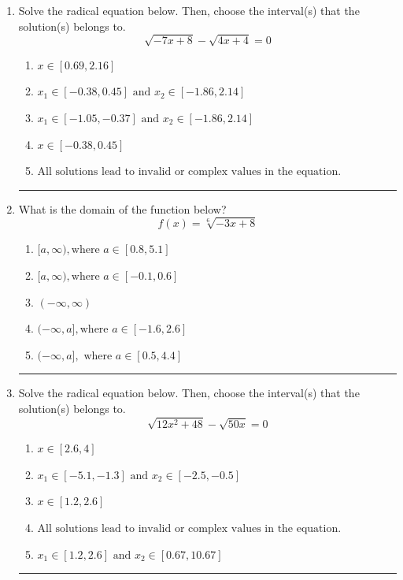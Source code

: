 \documentclass[14pt]{extbook}
\newcommand{\litem}[1]{\item#1\hspace*{-1cm}\rule{\textwidth}{0.4pt}}
\begin{document}
\begin{enumerate}
\litem{
Solve the radical equation below. Then, choose the interval(s) that the solution(s) belongs to.\[ \sqrt{-7 x + 8} - \sqrt{4 x + 4} = 0 \]\begin{enumerate}[label=\Alph*.]
\item \( x \in [0.69,2.16] \)
\item \( x_1 \in [-0.38, 0.45] \text{ and } x_2 \in [-1.86,2.14] \)
\item \( x_1 \in [-1.05, -0.37] \text{ and } x_2 \in [-1.86,2.14] \)
\item \( x \in [-0.38,0.45] \)
\item \( \text{All solutions lead to invalid or complex values in the equation.} \)

\end{enumerate} }
\litem{
What is the domain of the function below?\[ f(x) = \sqrt[6]{-3 x + 8} \]\begin{enumerate}[label=\Alph*.]
\item \( [a, \infty), \text{where } a \in [0.8, 5.1] \)
\item \( [a, \infty), \text{where } a \in [-0.1, 0.6] \)
\item \( (-\infty, \infty) \)
\item \( (-\infty, a], \text{where } a \in [-1.6, 2.6] \)
\item \( (-\infty, a], \text{ where } a \in [0.5, 4.4] \)

\end{enumerate} }
\litem{
Solve the radical equation below. Then, choose the interval(s) that the solution(s) belongs to.\[ \sqrt{12 x^2 + 48} - \sqrt{50 x} = 0 \]\begin{enumerate}[label=\Alph*.]
\item \( x \in [2.6,4] \)
\item \( x_1 \in [-5.1, -1.3] \text{ and } x_2 \in [-2.5,-0.5] \)
\item \( x \in [1.2,2.6] \)
\item \( \text{All solutions lead to invalid or complex values in the equation.} \)
\item \( x_1 \in [1.2, 2.6] \text{ and } x_2 \in [0.67,10.67] \)


\end{enumerate}}
\end{enumerate}
\end{document}

